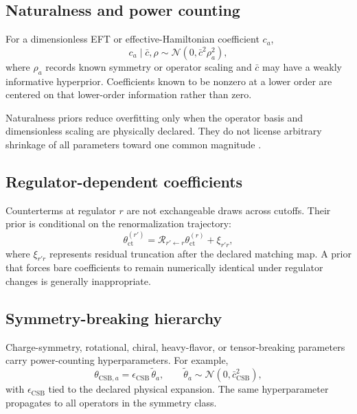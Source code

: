 \documentclass[11pt]{article}
\newcommand{\cR}{\mathcal R}
\begin{document}
\subsection{Naturalness and power counting}

For a dimensionless EFT or effective-Hamiltonian coefficient \(c_a\),
\begin{equation}
 c_a\mid\bar c,\rho
 \sim
 \mathcal N(0,\bar c^2 \rho_a^2),
 \label{eq:naturalness-prior}
\end{equation}
where \(\rho_a\) records known symmetry or operator scaling and \(\bar c\) may
have a weakly informative hyperprior.  Coefficients known to be nonzero at a
lower order are centered on that lower-order information rather than zero.

Naturalness priors reduce overfitting only when the operator basis and
dimensionless scaling are physically declared.  They do not license arbitrary
shrinkage of all parameters toward one common magnitude
\cite{Wesolowski2016,Furnstahl2015}.

\subsection{Regulator-dependent coefficients}

Counterterms at regulator \(r\) are not exchangeable draws across cutoffs.
Their prior is conditional on the renormalization trajectory:
\begin{equation}
 \theta_{\mathrm{ct}}^{(r')}
 =
 \cR_{r'\leftarrow r}
 \theta_{\mathrm{ct}}^{(r)}
 +
 \xi_{r'r},
 \label{eq:counterterm-flow-prior}
\end{equation}
where \(\xi_{r'r}\) represents residual truncation after the declared matching
map.  A prior that forces bare coefficients to remain numerically identical
under regulator changes is generally inappropriate.

\subsection{Symmetry-breaking hierarchy}

Charge-symmetry, rotational, chiral, heavy-flavor, or tensor-breaking
parameters carry power-counting hyperparameters.  For example,
\begin{equation}
 \theta_{\mathrm{CSB},a}
 =
 \epsilon_{\mathrm{CSB}}\,
 \widetilde\theta_a,
 \qquad
 \widetilde\theta_a\sim\mathcal N(0,\bar c_{\mathrm{CSB}}^2),
 \label{eq:csb-hierarchy}
\end{equation}
with \(\epsilon_{\mathrm{CSB}}\) tied to the declared physical expansion.  The
same hyperparameter propagates to all operators in the symmetry class.
\end{document}
